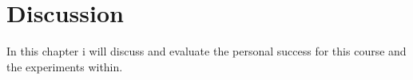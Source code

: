 \chapter{Discussion}
\label{cha:Diskussion}

In this chapter i will discuss and evaluate the personal success for this course and the experiments within. 